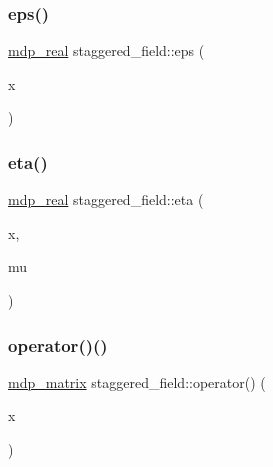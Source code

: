 \subsubsection{\texorpdfstring{eps()}{eps()}}
{\footnotesize\ttfamily \hyperlink{mdp__global__vars_8h_a69d96b74c791e0bbdb888b3913a69450}{mdp\+\_\+real} staggered\+\_\+field\+::eps (\begin{DoxyParamCaption}\item[{\hyperlink{mdp__compatibility__macros_8h_aa6f1179c424e48adef1cedf7c436eb75}{site}}]{x }\end{DoxyParamCaption})\hspace{0.3cm}{\ttfamily [inline]}}

\mbox{\label{classstaggered__field_a2f865e7dbd982109e584d26687f5340d}} 
\subsubsection{\texorpdfstring{eta()}{eta()}}
{\footnotesize\ttfamily \hyperlink{mdp__global__vars_8h_a69d96b74c791e0bbdb888b3913a69450}{mdp\+\_\+real} staggered\+\_\+field\+::eta (\begin{DoxyParamCaption}\item[{\hyperlink{mdp__compatibility__macros_8h_aa6f1179c424e48adef1cedf7c436eb75}{site}}]{x,  }\item[{int}]{mu }\end{DoxyParamCaption})\hspace{0.3cm}{\ttfamily [inline]}}

\mbox{\label{classstaggered__field_aa881451872889aa0b6c716c01f3fabb7}} 
\subsubsection{\texorpdfstring{operator()()}{operator()()}\hspace{0.1cm}{\footnotesize\ttfamily [1/3]}}
{\footnotesize\ttfamily \hyperlink{classmdp__matrix}{mdp\+\_\+matrix} staggered\+\_\+field\+::operator() (\begin{DoxyParamCaption}\item[{\hyperlink{mdp__compatibility__macros_8h_aa6f1179c424e48adef1cedf7c436eb75}{site}}]{x }\end{DoxyParamCaption})\hspace{0.3cm}{\ttfamily [inline]}}

